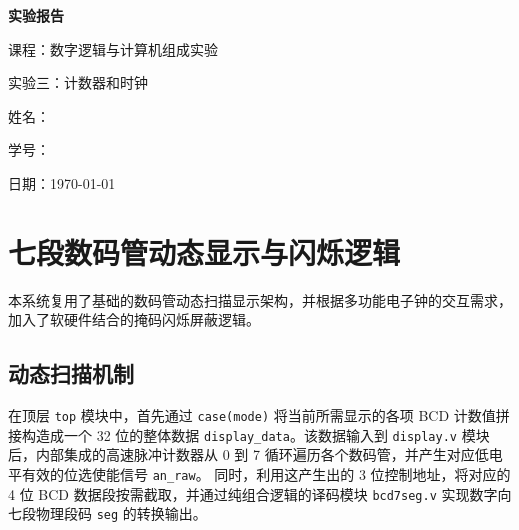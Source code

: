 \documentclass[12pt, a4paper]{ctexart}
\begin{document}
\begin{titlepage}
    \centering
    \vspace*{5cm}
    {\Huge\bfseries 实验报告\par}
    \vspace{2cm}
    {\Large 课程：数字逻辑与计算机组成实验\par}
    \vspace{1cm}
    {\Large 实验三：计数器和时钟\par}
    \vspace{4cm}
    {\large 姓名：\underline{}\par}
    \vspace{1cm}
    {\large 学号：\underline{}\par}
    \vspace{1cm}
    {\large 日期：\today\par}
\end{titlepage}

\tableofcontents
\newpage

\section{七段数码管动态显示与闪烁逻辑}
本系统复用了基础的数码管动态扫描显示架构，并根据多功能电子钟的交互需求，加入了软硬件结合的掩码闪烁屏蔽逻辑。

\subsection{动态扫描机制}
在顶层 \texttt{top} 模块中，首先通过 \texttt{case(mode)} 将当前所需显示的各项 BCD 计数值拼接构造成一个 32 位的整体数据 \texttt{display\_data}。该数据输入到 \texttt{display.v} 模块后，内部集成的高速脉冲计数器从 0 到 7 循环遍历各个数码管，并产生对应低电平有效的位选使能信号 \texttt{an\_raw}。
同时，利用这产生出的 3 位控制地址，将对应的 4 位 BCD 数据段按需截取，并通过纯组合逻辑的译码模块 \texttt{bcd7seg.v} 实现数字向七段物理段码 \texttt{seg} 的转换输出。
\end{document}
